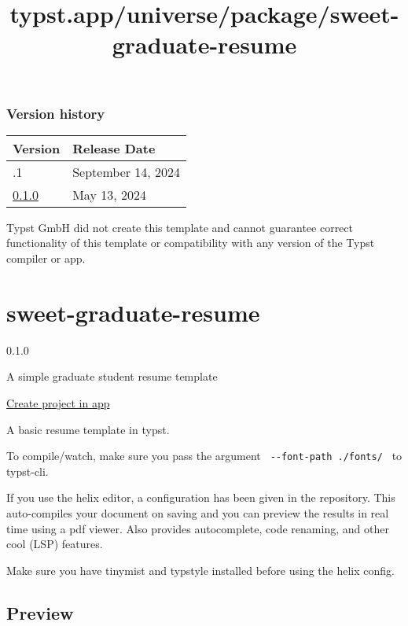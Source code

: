 \label{versions}
\subsubsection{Version history}\label{version-history}

\begin{longtable}[]{@{}ll@{}}
\toprule\noalign{}
Version & Release Date \\
\midrule\noalign{}
\endhead
\bottomrule\noalign{}
\endlastfoot
0.1.1 & September 14, 2024 \\
\href{https://typst.app/universe/package/aero-check/0.1.0/}{0.1.0} & May
13, 2024 \\
\end{longtable}

Typst GmbH did not create this template and cannot guarantee correct
functionality of this template or compatibility with any version of the
Typst compiler or app.


\title{typst.app/universe/package/sweet-graduate-resume}

\label{banner}
\label{template-thumbnail}

\section{sweet-graduate-resume}\label{sweet-graduate-resume}

{ 0.1.0 }

A simple graduate student resume template

\href{/app?template=sweet-graduate-resume&version=0.1.0}{Create project
in app}

\label{readme}
A basic resume template in typst.

To compile/watch, make sure you pass the argument
\texttt{\ -\/-font-path\ ./fonts/\ } to typst-cli.

If you use the helix editor, a configuration has been given in the
repository. This auto-compiles your document on saving and you can
preview the results in real time using a pdf viewer. Also provides
autocomplete, code renaming, and other cool (LSP) features.

Make sure you have tinymist and typstyle installed before using the
helix config.

\subsection{Preview}\label{preview}

